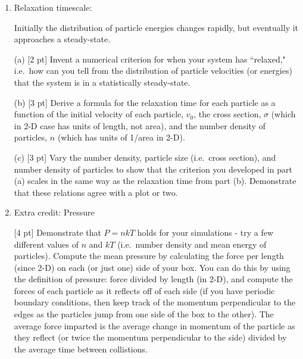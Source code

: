 \documentclass[12pt]{article}
\begin{document}
\begin{enumerate}
(b) [3 pt] Show that the energy (or speed) distribution 
of your simulation particles approaches a 2-D Maxwellian by
plotting the speed distribution, either a histogram or cumulative distribution, 
averaged over several timesteps (or over several simulations) to make a smooth
curve.  Overplot the 2-D Maxwellian distribution you computed in part (a),
normalized to agree.

(c) [3 pt] Now make half of the masses 10 times larger.
Does the velocity distribution follow a single Maxwellian? Does the
energy distribution?  Explain your results.

\item  Relaxation timescale:

Initially the distribution of particle energies changes rapidly, but
eventually it approaches a steady-state.  

(a) [2 pt] Invent a numerical criterion for when your system has ``relaxed," 
i.e.\ how can you tell from the distribution of particle velocities (or
energies) that the system is in a statistically steady-state. 

(b) [3 pt] Derive a formula for the relaxation time for each particle 
as a function of the initial velocity of each particle, $v_0$, the cross section,
$\sigma$ (which in 2-D case has units of length, not area), and the
number density of particles, $n$ (which has units of 1/area in 2-D).

(c) [3 pt] Vary the number density, particle size (i.e.\ cross section), and
number density of particles to show that the criterion you developed in part
(a) scales in the same way as the relaxation time from part (b).
Demonstrate that these relations agree with a plot or two.

\item  Extra credit: Pressure

[4 pt] Demonstrate that $P=nkT$ holds for your simulations - try a few
different values of $n$ and $kT$ (i.e.\ number density and mean energy of particles).
Compute the mean pressure by calculating the force per length (since 2-D)
on each (or just one) side of your box.  You can do this by using the
definition of pressure:  force divided by length (in 2-D), and compute
the forces of each particle as it reflects off of each side (if you have
periodic boundary conditions, then keep track of the momentum perpendicular
to the edges as the particles jump from one side of the box to the other).   
The average force imparted is the average change in momentum of the 
particle as they reflect (or twice the momentum perpendicular to the side) 
divided by the average time between collistions.
\end{enumerate}
\end{document}
